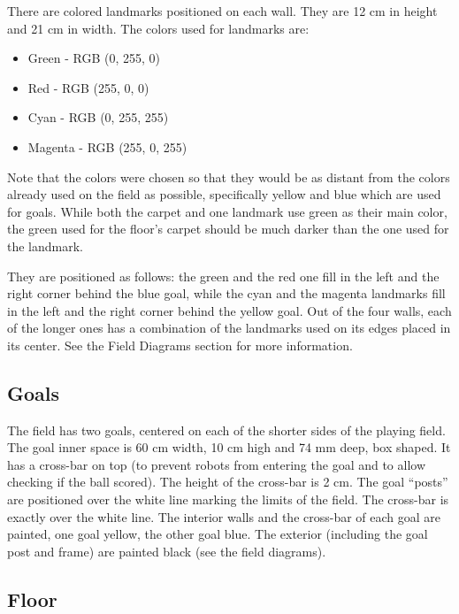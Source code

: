 \documentclass{article}
\begin{document}
There are colored landmarks positioned on each wall. They are 12 cm in height and 21 cm in width. The colors used for landmarks are:

\begin{itemize}
\item Green - RGB (0, 255, 0)

\item Red - RGB (255, 0, 0)

\item Cyan - RGB (0, 255, 255)

\item Magenta - RGB (255, 0, 255)

\end{itemize}
Note that the colors were chosen so that they would be as distant from the colors already used on the field as possible, specifically yellow and blue which are used for goals. While both the carpet and one landmark use green as their main color, the green used for the floor's carpet should be much darker than the one used for the landmark.

They are positioned as follows: the green and the red one fill in the left and the right corner behind the blue goal, while the cyan and the magenta landmarks fill in the left and the right corner behind the yellow goal. Out of the four walls, each of the longer ones has a combination of the landmarks used on its edges placed in its center. See the Field Diagrams section for more information.

\subsection{ Goals \label{ref-032}}

The field has two goals, centered on each of the shorter sides of the playing field. The goal inner space is 60 cm width, 10 cm high and 74 mm deep, box shaped. It has a cross-bar on top (to prevent robots from entering the goal and to allow checking if the ball scored). The height of the cross-bar is 2 cm. The goal ``posts'' are positioned over the white line marking the limits of the field. The cross-bar is exactly over the white line. The interior walls and the cross-bar of each goal are painted, one goal yellow, the other goal blue. The exterior (including the goal post and frame) are painted black (see the field diagrams).

\subsection{ Floor \label{ref-033}}
\end{document}
